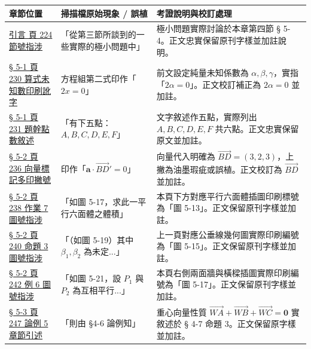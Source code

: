 \documentclass[a4paper,12pt,twoside]{article}
\begin{document}
\begin{table}[H]
\centering
\small
\renewcommand{\arraystretch}{1.35}
\begin{tabularx}{\textwidth}{|p{3.2cm}|p{3.8cm}|X|}
\hline
\textbf{章節位置} & \textbf{掃描檔原始現象 / 誤植} & \textbf{考證說明與校訂處理} \\ \hline

\hyperref[note:b3-ch5-p224-sec-ref]{引言 頁 224 節號指涉} & 
「從第三節所談到的一些實際的極小問題中」 & 
極小問題實際討論於本章第四節 § 5-4。正文忠實保留原刊字樣並加註說明。 \\ \hline

\hyperref[note:b3-ch5-p230-2alpha-typo]{§ 5-1 頁 230 算式未知數印刷訛字} & 
方程組第二式印作「$2x = 0$」 & 
前文設定純量未知係數為 $\alpha, \beta, \gamma$，實指「$2\alpha = 0$」。正文校訂補正為 $2\alpha = 0$ 並加註。 \\ \hline

\hyperref[note:b3-ch5-p231-ex3-points]{§ 5-1 頁 231 題幹點數敘述} & 
「有下五點：$A, B, C, D, E, F$」 & 
文字敘述作五點，實際列出 $A, B, C, D, E, F$ 共六點。正文忠實保留原文並加註。 \\ \hline

\hyperref[note:b3-ch5-p236-bd-prime]{§ 5-2 頁 236 向量標記多印撇號} & 
印作「$\mathbf{a} \cdot \vec{BD}' = 0$」 & 
向量代入明確為 $\vec{BD} = (3, 2, 3)$，上撇為油墨瑕疵或誤植。正文校訂為 $\vec{BD}$ 並加註。 \\ \hline

\hyperref[note:b3-ch5-p238-fig-ref]{§ 5-2 頁 238 作業 7 圖號指涉} & 
「如圖 5-17，求此一平行六面體之體積」 & 
本頁下方對應平行六面體插圖印刷標號為「圖 5-13」。正文保留原刊字樣並加註。 \\ \hline

\hyperref[note:b3-ch5-p240-fig-ref]{§ 5-2 頁 240 命題 3 圖號指涉} & 
「（如圖 5-19）其中 $\beta_1, \beta_2$ 為未定...」 & 
上一頁對應公垂線幾何圖實際印刷編號為「圖 5-15」。正文保留原刊字樣並加註。 \\ \hline

\hyperref[note:b3-ch5-p242-fig-ref]{§ 5-2 頁 242 例 6 圖號指涉} & 
「如圖 5-21，設 $P_1$ 與 $P_2$ 為互相平行...」 & 
本頁右側兩面牆與橫樑插圖實際印刷編號為「圖 5-17」。正文保留原刊字樣並加註。 \\ \hline

\hyperref[note:b3-ch5-p247-sec-ref]{§ 5-3 頁 247 論例 5 章節引述} & 
「則由 §4-6 論例知」 & 
重心向量性質 $\vec{WA} + \vec{WB} + \vec{WC} = \mathbf{0}$ 實敘述於 § 4-7 命題 3。正文保留原字樣並加註。 \\ \hline


\end{tabularx}
\end{table}
\end{document}
